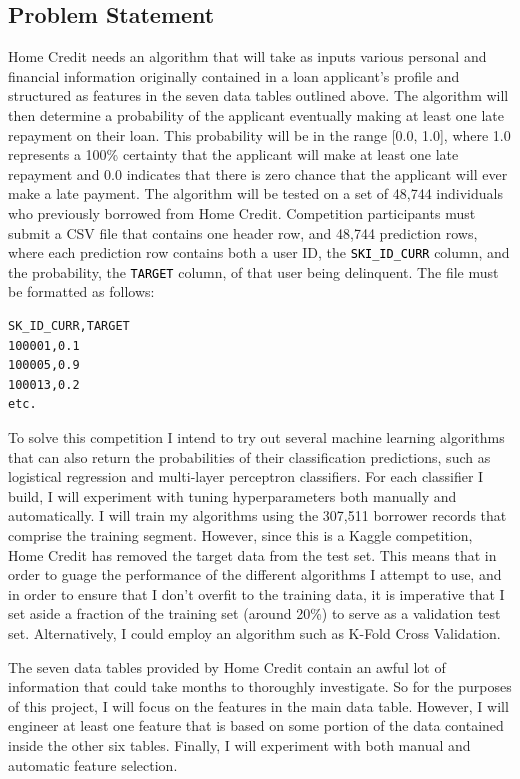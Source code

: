 \documentclass[12pt, letterpaper]{article}
\begin{document}
\subsection{Problem Statement}
Home Credit needs an algorithm that will take as inputs various personal and financial information originally contained in a loan applicant's profile and structured as features in the seven data tables outlined above. The algorithm will then determine a probability of the applicant eventually making at least one late repayment on their loan. This probability will be in the range [0.0, 1.0], where 1.0 represents a 100\% certainty that the applicant will make at least one late repayment and 0.0 indicates that there is zero chance that the applicant will ever make a late payment. The algorithm will be tested on a set of 48,744 individuals who previously borrowed from Home Credit. Competition participants must submit a CSV file that contains one header row, and 48,744 prediction rows, where each prediction row contains both a user ID, the \colorbox{backcolor}{\textcolor{black}{\texttt{SKI_ID_CURR}}} column, and the probability, the \colorbox{backcolor}{\textcolor{black}{\texttt{TARGET}}} column, of that user being delinquent. The file must be formatted as follows:

\begin{lstlisting}
SK_ID_CURR,TARGET
100001,0.1
100005,0.9
100013,0.2
etc.
\end{lstlisting}

To solve this competition I intend to try out several machine learning algorithms that can also return the probabilities of their classification predictions, such as logistical regression and multi-layer perceptron classifiers. For each classifier I build, I will experiment with tuning hyperparameters both manually and automatically. I will train my algorithms using the 307,511 borrower records that comprise the training segment. However, since this is a Kaggle competition, Home Credit has removed the target data from the test set. This means that in order to guage the performance of the different algorithms I attempt to use, and in order to ensure that I don't overfit to the training data, it is imperative that I set aside a fraction of the training set (around 20\%) to serve as a validation test set. Alternatively, I could employ an algorithm such as K-Fold Cross Validation.

The seven data tables provided by Home Credit contain an awful lot of information that could take months to thoroughly investigate. So for the purposes of this project, I will focus on the features in the main data table. However, I will engineer at least one feature that is based on some portion of the data contained inside the other six tables. Finally, I will experiment with both manual and automatic feature selection.
\end{document}
